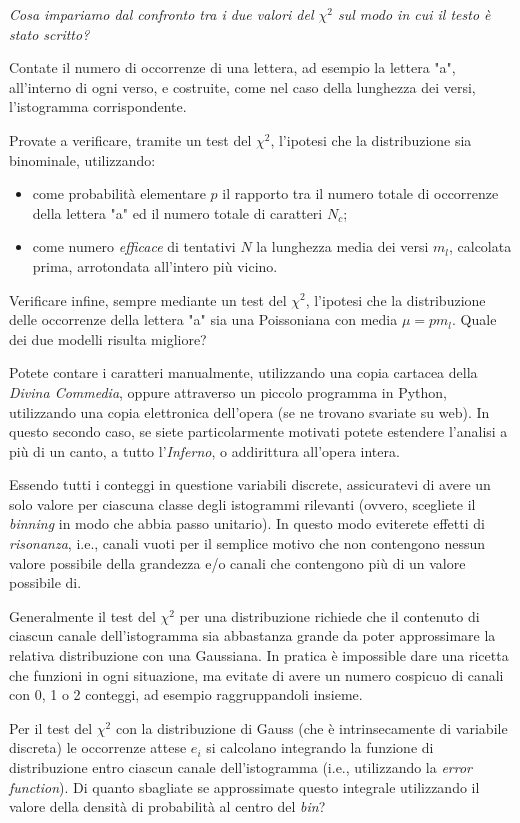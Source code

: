 \documentclass{lab1-article}
\begin{document}
\begin{article}
\emph{Cosa impariamo dal confronto tra i due valori del $\chi^2$ sul modo in
  cui il testo \`e stato scritto?}



Contate il numero di occorrenze di una lettera, ad esempio la lettera "a",
all'interno di ogni verso, e costruite, come nel caso della lunghezza dei
versi, l'istogramma corrispondente.

Provate a verificare, tramite un test del $\chi^2$, l'ipotesi che la
distribuzione sia binominale, utilizzando:
\begin{itemize}
  \item come probabilit\`a elementare $p$ il rapporto tra il numero totale di
  occorrenze della lettera "a" ed il numero totale di caratteri $N_c$;
  \item come numero \emph{efficace} di tentativi $N$ la lunghezza media dei
  versi $m_l$, calcolata prima, arrotondata all'intero pi\`u vicino.
\end{itemize}

Verificare infine, sempre mediante un test del $\chi^2$, l'ipotesi che
la distribuzione delle occorrenze della lettera "a" sia una Poissoniana con
media $\mu = p m_l$. Quale dei due modelli risulta migliore?


\secconsiderations

Potete contare i caratteri manualmente, utilizzando una copia cartacea
della \emph{Divina Commedia}, oppure attraverso un piccolo programma in
Python, utilizzando una copia elettronica dell'opera (se ne trovano
svariate su web). In questo secondo caso, se siete particolarmente motivati
potete estendere l'analisi a pi\`u di un canto, a tutto l'\emph{Inferno},
o addirittura all'opera intera.

Essendo tutti i conteggi in questione variabili discrete, assicuratevi di avere
un solo valore per ciascuna classe degli istogrammi rilevanti (ovvero, scegliete
il \emph{binning} in modo che abbia passo unitario). In questo modo eviterete
effetti di \emph{risonanza}, i.e., canali vuoti per il semplice motivo che non
contengono nessun valore possibile della grandezza e/o canali che contengono pi\`u
di un valore possibile di.

Generalmente il test del $\chi^2$ per una distribuzione richiede che il contenuto
di ciascun canale dell'istogramma sia abbastanza grande da poter approssimare
la relativa distribuzione con una Gaussiana. In pratica \`e impossible dare una
ricetta che funzioni in ogni situazione, ma evitate di avere un numero
cospicuo di canali con 0, 1 o 2 conteggi, ad esempio raggruppandoli insieme.

Per il test del $\chi^2$ con la distribuzione di Gauss (che \`e intrinsecamente
di variabile discreta) le occorrenze attese $e_i$ si calcolano integrando la
funzione di distribuzione entro ciascun canale dell'istogramma (i.e.,
utilizzando la \emph{error function}). Di quanto sbagliate se approssimate
questo integrale utilizzando il valore della densit\`a di probabilit\`a al
centro del \emph{bin}?


\onecolumn




\end{article}
\end{document}
